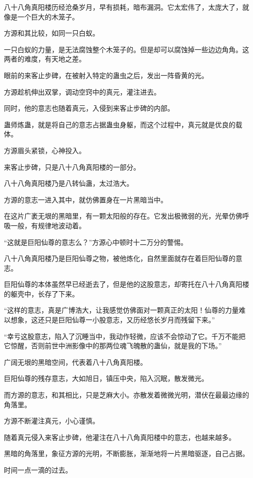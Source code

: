 \begin{this_body}
八十八角真阳楼历经沧桑岁月，早有损耗，暗布漏洞。它太宏伟了，太庞大了，就像是一个巨大的木笼子。

方源和其比较，如同一只白蚁。

一只白蚁的力量，是无法腐蚀整个木笼子的。但是却可以腐蚀掉一些边边角角。这两者的难度，有天地之差。

眼前的来客止步碑，在被射入特定的蛊虫之后，发出一阵昏黄的光。

方源趁机伸出双掌，调动空窍中的真元，灌注进去。

同时，他的意志也随着真元，入侵到来客止步碑的内部。

蛊师炼蛊，就是将自己的意志占据蛊虫身躯，而这个过程中，真元就是优良的载体。

方源眉头紧锁，心神投入。

来客止步碑，只是八十八角真阳楼的一部分。

八十八角真阳楼乃是八转仙蛊，太过浩大。

方源的意志一进入其中，就仿佛置身在一片黑暗当中。

在这片广袤无垠的黑暗里，有一颗太阳般的存在。它发出极微弱的光，光晕仿佛呼吸一般，有规律地波动着。

“这就是巨阳仙尊的意志么？”方源心中顿时十二万分的警惕。

八十八角真阳楼乃是巨阳仙尊之物，被他炼化，自然里面就存在着巨阳仙尊的意志。

巨阳仙尊的本体虽然早已经逝去了，但是他的这股意志，却寄托在八十八角真阳楼的躯壳中，长存了下来。

“这样的意志，真是广博浩大，让我感觉仿佛面对一颗真正的太阳！仙尊的力量难以想象，这还只是巨阳仙尊一小股意志，又历经悠长岁月而残留下来。”

“幸亏这股意志，陷入了沉睡当中，我动作轻微，应该不会惊动了它。千万不能把它惊醒，否则前世中洲影像中的那两位魂飞魄散的蛊仙，就是我的下场。”

广阔无垠的黑暗空间，代表着八十八角真阳楼。

巨阳仙尊的残存意志，大如旭日，镇压中央，陷入沉眠，散发微光。

而方源的意志，和其相比，只是芝麻大小。亦散发着微微光明，潜伏在最最边缘的角落里。

方源不断灌注真元，小心谨慎。

随着真元侵入来客止步碑，他灌注在八十八角真阳楼中的意志，也越来越多。

黑暗的角落里，象征方源的光明，不断膨胀，渐渐地将一片黑暗驱逐，自己占据。

时间一点一滴的过去。


\end{this_body}
